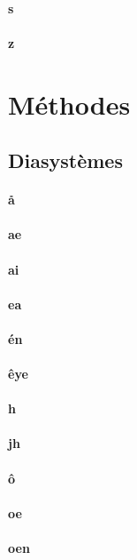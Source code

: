 \documentclass[french]{article}
\begin{document}
\paragraph{s}
\paragraph{z}

\section{Méthodes}

\subsection{Diasystèmes}

\paragraph{å}
\paragraph{ae}
\paragraph{ai}
\paragraph{ea}
\paragraph{én}
\paragraph{êye}
\paragraph{h}
\paragraph{jh}
\paragraph{ô}
\paragraph{oe}
\paragraph{oen}
\end{document}
